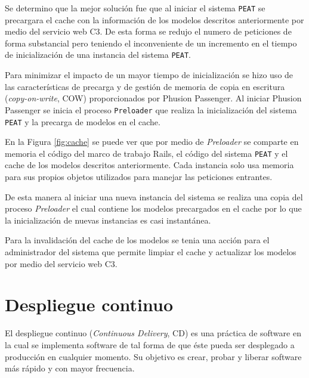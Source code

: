 Se determino que la mejor solución fue que al iniciar el sistema \texttt{PEAT}
se precargara el cache con la información de los modelos descritos anteriormente
por medio del servicio web C3. De esta forma se redujo el numero de peticiones de
forma substancial pero teniendo el inconveniente de un incremento en el tiempo
de inicialización de una instancia del sistema \texttt{PEAT}.

Para minimizar el impacto de un mayor tiempo de inicialización se hizo uso de las
características de precarga y de gestión de memoria de copia en escritura
(\textit{copy-on-write}, COW) proporcionados por Phusion Passenger. Al iniciar
Phusion Passenger se inicia el proceso \texttt{Preloader} que realiza la
inicialización del sistema \texttt{PEAT} y la precarga de modelos en el cache.

En la Figura \ref{fig:cache} se puede ver que por medio de \textit{Preloader}
se comparte en memoria el código del marco de trabajo Rails, el código del sistema
\texttt{PEAT} y el cache de los modelos descritos anteriormente. Cada instancia
solo usa memoria para sus propios objetos utilizados para manejar las
peticiones entrantes.

De esta manera al iniciar una nueva instancia del sistema se realiza una copia del
proceso \textit{Preloader} el cual contiene los modelos precargados en el cache por
lo que la inicialización de nuevas instancias es casi instantánea.


Para la invalidación del cache de los modelos se tenia una acción para el
administrador del sistema que permite limpiar el cache y actualizar los modelos
por medio del servicio web C3.



\section{Despliegue continuo}

El despliegue continuo (\textit{Continuous Delivery}, CD) es una práctica de software
en la cual se implementa software de tal forma de que éste pueda ser desplegado a
producción en cualquier momento\cite{27_martin_fowler_cd}. Su objetivo es crear,
probar y liberar software más rápido y con mayor frecuencia.

